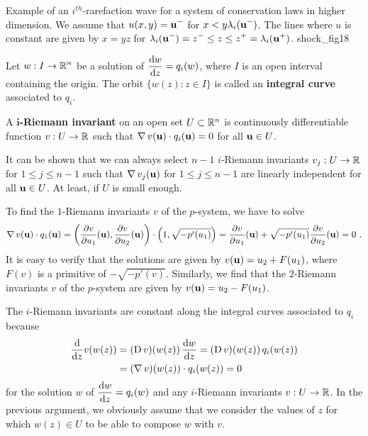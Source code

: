 {Example of an $\displaystyle i^{th}$-rarefaction wave for a system of
conservation laws in higher dimension.  We assume that
$\displaystyle u(x,y) = \VEC{u}^-$ for
$\displaystyle x< y \lambda_i(\VEC{u}^-)$.  The lines where $u$
is constant are given by $x= y z$ for $\displaystyle
\lambda_i(\VEC{u}^-) = z^- \leq z \leq z^+ = \lambda_i(\VEC{u}^+)$.}
{shock_fig18}

\begin{defn}
Let $\displaystyle w:I \to \RR^n$ be a solution of
$\displaystyle \dydx{w}{z} = q_i(w)$, where $I$ is an open interval
containing the origin.  The orbit $\{ w(z) : z\in I \}$ is called an
{\bfseries integral curve}
associated to $q_i$.
\end{defn}

\begin{defn}
A {\bfseries $\mathbf{i}$-Riemann invariant} on an open set $U \subset \RR^n$ is
continuously differentiable function $v:U \to \RR$ such that
$\displaystyle \graD v(\VEC{u}) \cdot q_i(\VEC{u}) = 0$
for all $\VEC{u} \in U$.
\end{defn}

It can be shown that we can always select $n-1$ $i$-Riemann invariants
$v_j:U \to \RR$ for $1 \leq j \leq n-1$ such that
$\displaystyle \graD v_j(\VEC{u})$ for $1\leq j\leq n-1$ are linearly
independent for all $\VEC{u} \in U$.  At least, if $U$ is small enough.

\begin{egg}   \label{eggPsystem4}
To find the $1$-Riemann invariants $v$ of the $p$-system, we have to
solve
\[
\graD v(\VEC{u}) \cdot q_1(\VEC{u})
= \left( \pdydx{v}{u_1}(\VEC{u}) , \pdydx{v}{u_2}(\VEC{u}) \right)
\cdot \left( 1 , \sqrt{-p'(u_1)} \right) 
= \pdydx{v}{u_1}(\VEC{u}) + \sqrt{-p'(u_1)} \pdydx{v}{u_2}(\VEC{u}) = 0 \ .
\]
It is easy to verify that the solutions are given by
$v(\VEC{u}) = u_2 + F(u_1)$, where $F(v)$ is a primitive of
$-\sqrt{-p'(v)}$.  Similarly, we find that the $2$-Riemann invariants
$v$ of the $p$-system are given by
$v(\VEC{u}) = u_2 - F(u_1)$.
\end{egg}

The $i$-Riemann invariants are constant along the integral curves
associated to $q_i$ because
\begin{equation} \label{iRiemannInv}
\begin{split}
\dfdx{v(w(z))}{z} &= (\diff v)(w(z)) \, \dydx{w}{z}
= (\diff v)(w(z))\, q_i(w(z)) \\
&= (\graD v)(w(z)) \cdot q_i(w(z)) = 0
\end{split}
\end{equation}
for the solution $w$ of $\displaystyle \dydx{w}{z} = q_i(w)$ and
any $i$-Riemann invariants $v:U \to \RR$.   In the previous argument,
we obviously assume that we consider the values of $z$ for which
$w(z) \in U$ to be able to compose $w$ with $v$.

